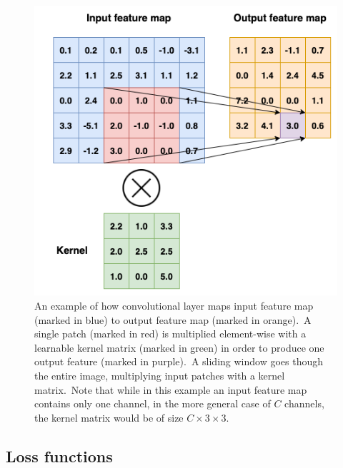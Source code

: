 \documentclass[longabstract, english, mgr]{iithesis}
\theoremstyle{default_theorem_style}\newtheorem{theorem}{Theorem}
\theoremstyle{default_theorem_style}\newtheorem{definition}{Definition}
\begin{document}
\begin{figure}[t]
\centering
\includegraphics[scale=0.48]{convolutional_network}
\caption{An example of how convolutional layer maps input feature map (marked in blue) to output feature
map (marked in orange).\ A single patch (marked in red) is multiplied element-wise with a learnable kernel matrix
(marked in green) in order to produce one output feature (marked in purple).\ A sliding window goes though the entire
image, multiplying input patches with a kernel matrix.\ Note that while in this example an input feature map contains
only one channel, in the more general case of $C$ channels, the kernel matrix would be of size $C \times 3 \times 3$.}
\label{fig:convolutional_network}
\end{figure}

\subsection{Loss functions}\label{subsec:loss_functions}
\end{document}
